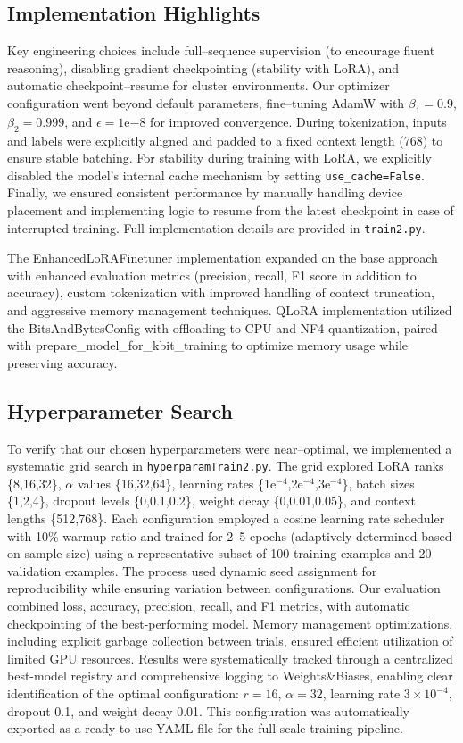 \documentclass[11pt]{article}
\begin{document}
\subsection{Implementation Highlights}
Key engineering choices include full--sequence supervision (to encourage fluent reasoning), disabling gradient checkpointing (stability with LoRA), and automatic checkpoint--resume for cluster environments. Our optimizer configuration went beyond default parameters, fine--tuning AdamW with $\beta_1{=}0.9$, $\beta_2{=}0.999$, and $\epsilon{=}1\mathrm{e}{-8}$ for improved convergence. During tokenization, inputs and labels were explicitly aligned and padded to a fixed context length (768) to ensure stable batching. For stability during training with LoRA, we explicitly disabled the model's internal cache mechanism by setting \texttt{use\_cache=False}. Finally, we ensured consistent performance by manually handling device placement and implementing logic to resume from the latest checkpoint in case of interrupted training. Full implementation details are provided in \verb|train2.py|.

The EnhancedLoRAFinetuner implementation expanded on the base approach with enhanced evaluation metrics (precision, recall, F1 score in addition to accuracy), custom tokenization with improved handling of context truncation, and aggressive memory management techniques. QLoRA implementation utilized the BitsAndBytesConfig with offloading to CPU and NF4 quantization, paired with prepare\_model\_for\_kbit\_training to optimize memory usage while preserving accuracy.

\subsection{Hyperparameter Search}
To verify that our chosen hyperparameters were near--optimal, we implemented a systematic grid search in \verb|hyperparamTrain2.py|. The grid explored LoRA ranks \{8,16,32\}, $\alpha$ values \{16,32,64\}, learning rates \{1e$^{-4}$,2e$^{-4}$,3e$^{-4}$\}, batch sizes \{1,2,4\}, dropout levels \{0,0.1,0.2\}, weight decay \{0,0.01,0.05\}, and context lengths \{512,768\}. Each configuration employed a cosine learning rate scheduler with 10\% warmup ratio and trained for 2--5 epochs (adaptively determined based on sample size) using a representative subset of 100 training examples and 20 validation examples. The process used dynamic seed assignment for reproducibility while ensuring variation between configurations. Our evaluation combined loss, accuracy, precision, recall, and F1 metrics, with automatic checkpointing of the best-performing model. Memory management optimizations, including explicit garbage collection between trials, ensured efficient utilization of limited GPU resources. Results were systematically tracked through a centralized best-model registry and comprehensive logging to Weights\&Biases, enabling clear identification of the optimal configuration: $r{=}16$, $\alpha{=}32$, learning rate $3\times10^{-4}$, dropout 0.1, and weight decay 0.01. This configuration was automatically exported as a ready-to-use YAML file for the full-scale training pipeline.
\end{document}
